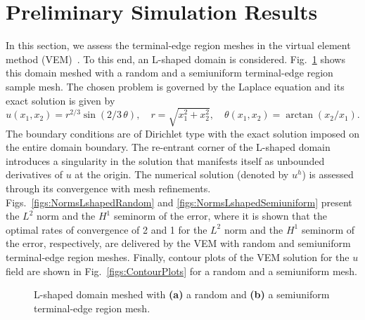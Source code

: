 \documentclass[pdflatex,sn-mathphys]{sn-jnl}%
\theoremstyle{thmstyleone}%
\theoremstyle{thmstyletwo}%
\theoremstyle{thmstylethree}%
\begin{document}
\section{Preliminary Simulation Results}
\label{sec:simulation_results}
In this section, we assess the terminal-edge region meshes in the virtual element method (VEM)~\cite{Basisprinciples}. To this end,
an L-shaped domain is considered. Fig.~\ref{figs:Lshaped} shows this domain meshed with a random and a semiuniform 
terminal-edge region sample mesh. The chosen problem is governed by the Laplace equation and
its exact solution is given by~\cite{MITCHELL2013350}
\begin{equation*}
u(x_1,x_2)=r^{2/3} \sin(2/3\,\theta), \quad r=\sqrt{x_1^2+x_2^2}, \quad \theta(x_1,x_2)=\arctan(x_2/x_1).
\end{equation*}
The boundary conditions are of Dirichlet type with the exact solution imposed on the entire domain boundary.
The re-entrant corner of the L-shaped domain introduces a singularity in the solution that manifests 
itself as unbounded derivatives of $u$ at the origin. The numerical solution (denoted by $u^h$) is assessed through
its convergence with mesh refinements. Figs.~\ref{figs:NormsLshapedRandom} and 
\ref{figs:NormsLshapedSemiuniform} present the $L^2$ norm and the $H^1$ seminorm
of the error, where it is shown that the optimal rates of convergence of 2 and 1 for the $L^2$ norm
and the $H^1$ seminorm of the error, respectively, are delivered by the VEM with random and 
semiuniform terminal-edge region meshes. Finally, contour plots of the VEM solution
for the $u$ field are shown in Fig.~\ref{figs:ContourPlots} for a random and a semiuniform mesh.

\begin{figure}[!bth]
\centering     %
{} \hspace{0.1cm}
\caption{L-shaped domain meshed with \textbf{(a)} a random and \textbf{(b)} a semiuniform terminal-edge region mesh.}
\label{figs:Lshaped} 
\end{figure}
\end{document}
